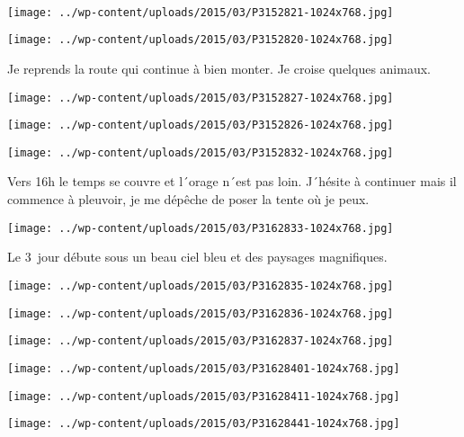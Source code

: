 \pagebreak
~\\
\begin{center} \texttt{[image: ../wp-content/uploads/2015/03/P3152821-1024x768.jpg]} \end{center}
\begin{center} \texttt{[image: ../wp-content/uploads/2015/03/P3152820-1024x768.jpg]} \end{center}
\vspace{-\topsep}
\vspace{-3mm}

\pagebreak
 Je reprends la route qui continue à bien monter. Je croise quelques animaux.
\begin{center} \texttt{[image: ../wp-content/uploads/2015/03/P3152827-1024x768.jpg]} \end{center}
\begin{center} \texttt{[image: ../wp-content/uploads/2015/03/P3152826-1024x768.jpg]} \end{center}
\begin{center} \texttt{[image: ../wp-content/uploads/2015/03/P3152832-1024x768.jpg]} \end{center}

 Vers 16h le temps se couvre et l´orage n´est pas loin. J´hésite à continuer mais il commence à pleuvoir, je me dépêche de poser la tente où je peux.
\begin{center} \texttt{[image: ../wp-content/uploads/2015/03/P3162833-1024x768.jpg]} \end{center}
\vspace{-\topsep}

\pagebreak
 Le 3\ieme\ jour débute sous un beau ciel bleu et des paysages magnifiques. 
\begin{center} \texttt{[image: ../wp-content/uploads/2015/03/P3162835-1024x768.jpg]} \end{center}
\begin{center} \texttt{[image: ../wp-content/uploads/2015/03/P3162836-1024x768.jpg]} \end{center}
\begin{center} \texttt{[image: ../wp-content/uploads/2015/03/P3162837-1024x768.jpg]} \end{center}
\begin{center} \texttt{[image: ../wp-content/uploads/2015/03/P31628401-1024x768.jpg]} \end{center}
\begin{center} \texttt{[image: ../wp-content/uploads/2015/03/P31628411-1024x768.jpg]} \end{center}
\vfill
\begin{center} \texttt{[image: ../wp-content/uploads/2015/03/P31628441-1024x768.jpg]} \end{center}
\vspace{-\topsep}
\vspace{-0.75mm}

